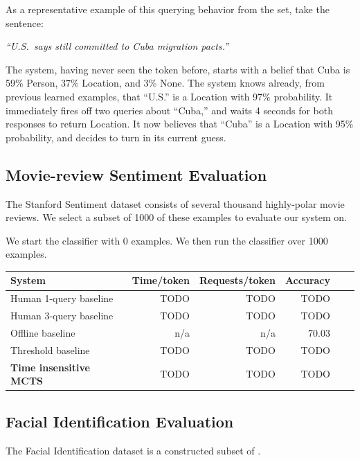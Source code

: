 As a representative example of this querying behavior from the set, take the sentence:

\begin{center}
\textit{``U.S.\ says still committed to Cuba migration pacts.''}
\end{center}

The system, having never seen the token before, starts with a belief that Cuba is 59\% Person, 37\% Location, and 3\% None. The system knows already, from previous learned examples, that ``U.S.'' is a Location with 97\% probability. It immediately fires off two queries about ``Cuba,'' and waits 4 seconds for both responses to return Location. It now believes that ``Cuba'' is a Location with 95\% probability, and decides to turn in its current guess.

\subsection{Movie-review Sentiment Evaluation}

The Stanford Sentiment dataset consists of several thousand highly-polar movie reviews. We select a subset of 1000 of these examples to evaluate our system on.

We start the classifier with 0 examples. We then run the classifier over 1000 examples.

\begin{center}
\begin{tabular}{ | l | r | r | r | r | r | }
    \hline
    \textbf{System} & \textbf{Time/token} & \textbf{Requests/token} & \textbf{Accuracy} \\ \hline
    Human 1-query baseline & TODO & TODO & TODO \\ \hline
    Human 3-query baseline & TODO & TODO & TODO \\ \hline
    Offline baseline & n/a & n/a & 70.03 \\ \hline
    Threshold baseline & TODO & TODO & TODO \\ \hline
    \textbf{Time insensitive MCTS} & TODO & TODO & TODO\\ \hline
\end{tabular}
\end{center}

\subsection{Facial Identification Evaluation}

The Facial Identification dataset is a constructed subset of .

